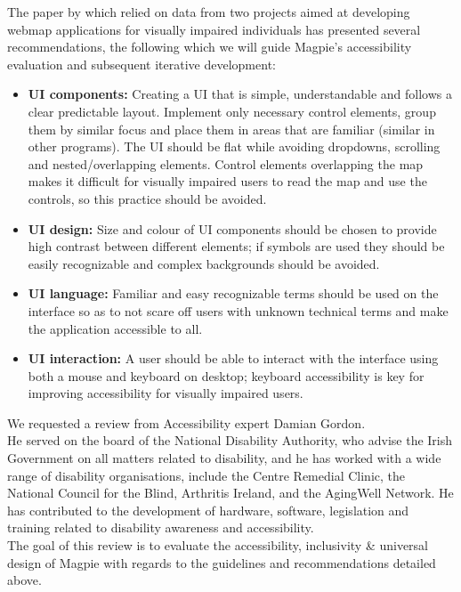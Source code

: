 \noindent The paper by \cite{accessibilitywebmapsrecommendations2017} which relied on data from two projects aimed at developing web\-map applications for visually impaired individuals has presented several recommendations, the following which we will guide Magpie's accessibility evaluation and subsequent iterative development:
\begin{itemize}
    \item\textbf{UI components:} Creating a UI that is simple, understandable and follows a clear predictable layout. Implement only necessary control elements, group them by similar focus and place them in areas that are familiar (similar in other programs). The UI should be flat while avoiding dropdowns, scrolling and nested/overlapping elements. Control elements overlapping the map makes it difficult for visually impaired users to read the map and use the controls, so this practice should be avoided.\\
    \item\textbf{UI design:} Size and colour of UI components should be chosen to provide high contrast between different elements; if symbols are used they should be easily recognizable and complex backgrounds should be avoided.\\
    \item\textbf{UI language:} Familiar and easy recognizable terms should be used on the interface so as to not scare off users with unknown technical terms and make the application accessible to all.\\
    \item\textbf{UI interaction:} A user should be able to interact with the interface using both a mouse and keyboard on desktop; keyboard accessibility is key for improving accessibility for visually impaired users.
\end{itemize}

\newpage
\noindent We requested a review from Accessibility expert Damian Gordon.\\
He served on the board of the National Disability Authority, who advise the Irish Government on all matters related to disability, and he has worked with a wide range of disability organisations, include the Centre Remedial Clinic, the National Council for the Blind, Arthritis Ireland, and the Aging\-Well Network. He has contributed to the development of hardware, software, legislation and training related to disability awareness and accessibility. \\

\noindent The goal of this review is to evaluate the accessibility, inclusivity \& universal design of Magpie with regards to the guidelines and recommendations detailed above.\\

